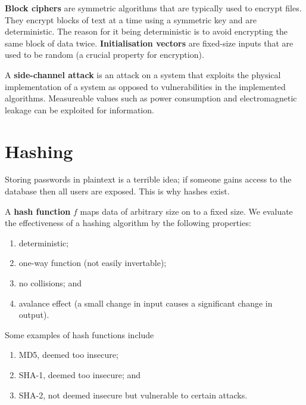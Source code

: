\begin{example}
    \textbf{Block ciphers} are symmetric algorithms that are typically used to encrypt files. They encrypt blocks of text at a time using a symmetric key and are deterministic. The reason for it being deterministic is to avoid encrypting the same block of data twice. \textbf{Initialisation vectors} are fixed-size inputs that are used to be random (a crucial property for encryption).
\end{example}

\begin{definition}
    A \textbf{side-channel attack} is an attack on a system that exploits the physical implementation of a system as opposed to vulnerabilities in the implemented algorithms. Measureable values such as power consumption and electromagnetic leakage can be exploited for information.
\end{definition}

\section{Hashing}

Storing passwords in plaintext is a terrible idea; if someone gains access to the database then all users are exposed. This is why hashes exist.

\begin{definition}
    A \textbf{hash function} $f$ maps data of arbitrary size on to a fixed size. We evaluate the effectiveness of a hashing algorithm by the following properties:
    \begin{enumerate}
        \item deterministic;
        \item one-way function (not easily invertable);
        \item no collisions; and
        \item avalance effect (a small change in input causes a significant change in output).
    \end{enumerate}
\end{definition}

\begin{example}
    Some examples of hash functions include
    \begin{enumerate}
        \item MD5, deemed too insecure;
        \item SHA-1, deemed too insecure; and
        \item SHA-2, not deemed insecure but vulnerable to certain attacks.
    \end{enumerate}
\end{example}

